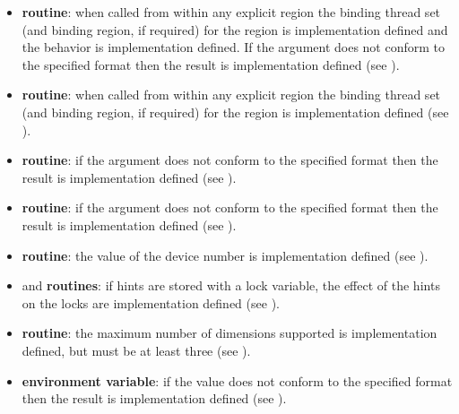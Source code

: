 \begin{itemize}
\item {} \textbf{routine}: when called from within any explicit
 region the binding thread set (and binding region, if required) for the
 region is implementation defined and the
behavior is implementation defined. If the argument does not
conform to the specified format then the result is implementation defined (see
).

\item {} \textbf{routine}: when called from within any explicit
 region the binding thread set (and binding region, if required) for the
 region is implementation defined (see
).

\item {} \textbf{routine}:  if the argument does not
conform to the specified format then the result is implementation defined (see
).

\item {} \textbf{routine}:  if the  argument does not
conform to the specified format then the result is implementation defined (see
).

\item {} \textbf{routine}: the value of
  the device number is implementation defined (see ).

\item {} and  \textbf{routines}:
if hints are stored with a lock variable, the effect of the hints on the locks are implementation defined
(see ).

\item {} \textbf{routine}:
  the maximum number of dimensions supported is implementation defined, but
  must be at least three (see ).

\item {} \textbf{environment variable}: if the value does not
conform to the specified format then the result is implementation defined (see
).


\end{itemize}
